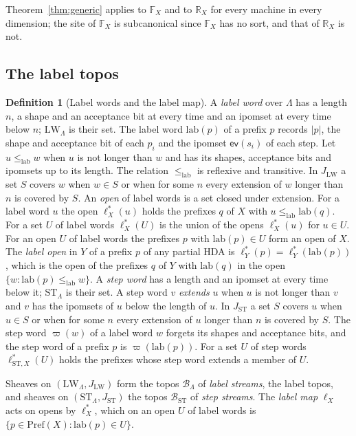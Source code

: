 \documentclass{lmcs}
\theoremstyle{definition}
\newtheorem{definition}[theorem]{Definition}
\theoremstyle{remark}
\newcommand{\dimn}[1]{\lvert #1\rvert}
\newcommand{\ip}{\mathsf{ev}}
\newcommand{\JLW}{J_{\LW}}
\newcommand{\Pref}{\mathrm{Pref}}
\newcommand{\FX}[1]{\mathbb{F}_{#1}}
\newcommand{\RX}[1]{\mathbb{R}_{#1}}
\newcommand{\lab}{\mathrm{lab}}
\newcommand{\lle}{\leq_{\mathrm{lab}}}
\newcommand{\LW}{\mathrm{LW}}
\providecommand{\lab}{\mathrm{lab}}
\providecommand{\BL}{\mathcal{B}_{\Lambda}}
\providecommand{\BST}{\mathcal{B}_{\mathrm{ST}}}
\providecommand{\SW}{\mathrm{ST}}
\providecommand{\JSW}{J_{\mathrm{ST}}}
\providecommand{\fgt}{\varpi}
\providecommand{\lsts}[1]{\ell^{*}_{\mathrm{ST},#1}}
\providecommand{\lst}[1]{\ell^{*}_{#1}}
\begin{document}
Theorem~\ref{thm:generic} applies to $\FX{X}$ and to $\RX{X}$ for every machine in every
dimension; the site of $\FX{X}$ is subcanonical since $\FX{X}$ has no sort, and that of
$\RX{X}$ is not.

\subsection{The label topos}\label{ssec:labels}

\begin{definition}[Label words and the label map]\label{def:labels}\label{def:setup-base}
A \emph{label word} over $\Lambda$ has a length $n$, a shape and an acceptance bit at every time and an ipomset at
every time below $n$; $\LW_\Lambda$ is their set. The label word $\lab(p)$ of a prefix $p$
records $\dimn{p}$, the shape and acceptance bit of each $p_i$ and the ipomset $\ip(s_i)$ of each
step. Let $u\lle w$ when $u$ is not longer than $w$ and has its shapes, acceptance bits and
ipomsets up to its length. The relation $\lle$ is reflexive and
transitive. In $\JLW$ a set $S$ covers $w$ when $w\in S$ or when for some $n$ every
extension of $w$ longer than $n$ is covered by $S$. An \emph{open} of label words is a set
closed under extension. For a label word $u$ the open $\lst{X}(u)$ holds the prefixes $q$ of
$X$ with $u\lle\lab(q)$. For a set $U$ of label words $\lst{X}(U)$ is
the union of the opens $\lst{X}(u)$ for $u\in U$. For an open $U$ of label words
the prefixes $p$ with $\lab(p)\in U$ form an open of $X$. The \emph{label open} in $Y$ of a
prefix $p$ of any partial HDA is $\lst{Y}(p)=\lst{Y}(\lab(p))$, which is the open of the
prefixes $q$ of $Y$ with $\lab(q)$ in the open $\{w : \lab(p)\lle w\}$. A \emph{step
word} has a length and an ipomset at every time below it; $\SW_\Lambda$ is their set. A step
word $v$ \emph{extends} $u$ when $u$ is not longer than $v$ and $v$ has the ipomsets of $u$ below the length of
$u$. In $\JSW$ a set $S$ covers $u$ when $u\in S$ or when for some $n$ every extension of $u$
longer than $n$ is covered by $S$. The step word $\fgt(w)$ of a label word $w$
forgets its shapes and acceptance bits, and the step word of a prefix $p$ is
$\fgt(\lab(p))$. For a set $U$ of step words $\lsts{X}(U)$ holds the
prefixes whose step word extends a member of $U$.
\end{definition}

Sheaves on $(\LW_\Lambda,\JLW)$ form the topos $\BL$ of \emph{label streams}, the label topos, and sheaves on
$(\SW_\Lambda,\JSW)$ the topos $\BST$ of \emph{step streams}. The \emph{label map} $\ell_X$ acts on opens by $\lst{X}$,
which on an open $U$ of label words is $\{p\in\Pref(X) : \lab(p)\in U\}$.
\end{document}
